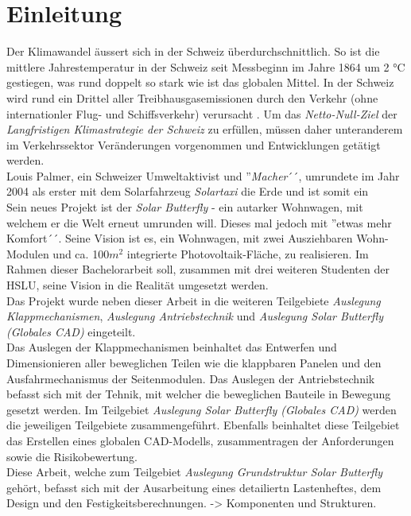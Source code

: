 \section{Einleitung}
Der Klimawandel äussert sich in der Schweiz überdurchschnittlich. So ist die mittlere Jahrestemperatur in der Schweiz seit Messbeginn im Jahre 1864 um 2 °C gestiegen, was rund doppelt so stark wie ist das globalen Mittel. In der Schweiz wird rund ein Drittel aller Treibhausgasemissionen durch den Verkehr (ohne internationler Flug- und Schiffsverkehr) verursacht \cite{BAFU}. Um das \emph{Netto-Null-Ziel} der \emph{Langfristigen Klimastrategie der Schweiz} zu erfüllen, müssen daher unteranderem im Verkehrssektor Veränderungen vorgenommen und Entwicklungen getätigt werden.\\
Louis Palmer, ein Schweizer Umweltaktivist und ''\emph{Macher}´´,  umrundete im Jahr 2004 als erster mit dem Solarfahrzeug \emph{Solartaxi} die Erde und ist somit ein \\

Sein neues Projekt ist der \emph{Solar Butterfly} - ein autarker Wohnwagen, mit welchem er die Welt erneut umrunden will. Dieses mal jedoch mit ''etwas mehr Komfort´´. Seine Vision ist es, ein Wohnwagen, mit zwei Ausziehbaren Wohn-Modulen und ca. 100$m^2$ integrierte Photovoltaik-Fläche, zu realisieren. Im Rahmen dieser Bachelorarbeit soll, zusammen mit drei weiteren Studenten der HSLU, seine Vision in die Realität umgesetzt werden.\\
Das Projekt wurde neben dieser Arbeit in die weiteren Teilgebiete \emph{Auslegung Klappmechanismen}, \emph{Auslegung Antriebstechnik} und \emph{Auslegung Solar Butterfly (Globales CAD)} eingeteilt.\\
Das Auslegen der Klappmechanismen beinhaltet das Entwerfen und Dimensionieren aller beweglichen Teilen wie die klappbaren Panelen und den Ausfahrmechanismus der Seitenmodulen. Das Auslegen der Antriebstechnik befasst sich mit der Tehnik, mit welcher die beweglichen Bauteile in Bewegung gesetzt werden. Im Teilgebiet \emph{Auslegung Solar Butterfly (Globales CAD)} werden die jeweiligen Teilgebiete zusammengeführt. Ebenfalls beinhaltet diese Teilgebiet das Erstellen eines globalen CAD-Modells, zusammentragen der Anforderungen sowie die Risikobewertung.\\

Diese Arbeit, welche zum Teilgebiet \emph{Auslegung Grundstruktur Solar Butterfly} gehört, befasst sich mit der Ausarbeitung eines detailiertn Lastenheftes, dem Design und den Festigkeitsberechnungen. -> Komponenten und Strukturen.

